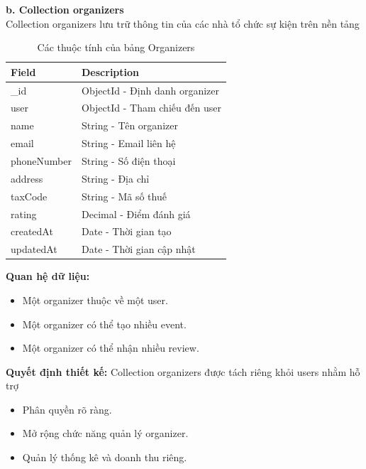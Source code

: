 \textbf{b. Collection organizers} \\
Collection organizers lưu trữ thông tin của các nhà tổ chức sự kiện trên nền tảng
\setlength{\LTleft}{0pt}
\setlength{\LTright}{0pt}
\begin{longtable}{|p{4cm}|p{11.2cm}|}
\caption{Các thuộc tính của bảng Organizers}\\[15pt]
\hline
\textbf{Field} & \textbf{Description} \\ \hline
\_id & ObjectId - Định danh organizer \\ \hline
user & ObjectId - Tham chiếu đến user \\ \hline
name & String - Tên organizer \\ \hline
email & String - Email liên hệ \\ \hline
phoneNumber & String - Số điện thoại \\ \hline
address & String - Địa chỉ \\ \hline
taxCode & String - Mã số thuế \\ \hline
rating & Decimal - Điểm đánh giá \\ \hline
createdAt & Date - Thời gian tạo \\ \hline
updatedAt & Date - Thời gian cập nhật \\ \hline
\end{longtable}
\textbf{Quan hệ dữ liệu:}
\begin{itemize}
    \item[-] Một organizer thuộc về một user.
    \item[-] Một organizer có thể tạo nhiều event.
    \item[-] Một organizer có thể nhận nhiều review.
\end{itemize}
\textbf{Quyết định thiết kế:} Collection organizers được tách riêng khỏi users nhằm hỗ trợ
\begin{itemize}
    \item[-] Phân quyền rõ ràng.
    \item[-] Mở rộng chức năng quản lý organizer.
    \item[-] Quản lý thống kê và doanh thu riêng.
\end{itemize}


